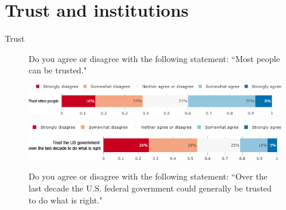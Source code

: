 \documentclass[aspectratio=169,9pt,dvipsnames]{beamer}
\begin{document}
\section{Trust and institutions}

\begin{frame}{Trust}%
\vspace{-.5cm}
\begin{figure}[h!]
\caption{Do you agree or disagree with the following statement: ``Most people can be trusted."}
\includegraphics[width=.8\textwidth]{../figures/US/can_trust_people_US.png} \\
\vspace{.1cm}
\caption{Do you agree or disagree with the following statement: ``Over the last decade the U.S. federal government could generally be trusted to do what is right."}
\includegraphics[width=.8\textwidth]{../figures/US/can_trust_govt_US.png}\\
\end{figure}
\end{frame}
\end{document}
